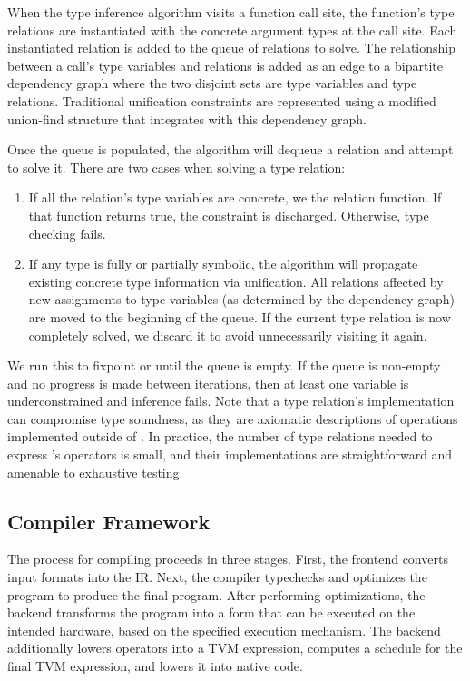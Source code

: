   When the type inference algorithm visits a function call site, the function's type relations are
    instantiated with the concrete argument types at the call site.
  Each instantiated relation is added to the queue of relations to solve.
  The relationship between a call's type variables and relations is added as an edge to
    a bipartite dependency graph where the two disjoint sets are type variables and type relations.
  Traditional unification constraints are represented using a modified union-find structure that
    integrates with this dependency graph.

  Once the queue is populated, the algorithm will dequeue a relation and attempt to solve it.
  There are two cases when solving a type relation:
  \begin{enumerate}
    \item If all the relation's type variables
    are concrete, we the relation function. If that function returns true, the
    constraint is discharged. Otherwise, type checking fails.
    \item If any type is fully or partially symbolic, the
      algorithm will propagate
      existing concrete type information via unification.
    All relations affected by new assignments to type
      variables (as determined by the dependency graph)
      are moved to the beginning of the queue.
    If the current type relation is now completely solved, we
    discard it to avoid unnecessarily visiting it again.
  \end{enumerate}

  We run this to fixpoint or until the queue is empty.
  If the queue is non-empty and no progress is made between iterations,
    then at least one variable is underconstrained and inference fails.
  Note that a type relation's implementation can
    compromise type soundness, as they are axiomatic descriptions
    of operations implemented outside of \relay.
  In practice, the number of type relations needed to express \relay's
    operators is small, and their implementations are straightforward
    and amenable to exhaustive testing.

  \subsection{Compiler Framework}

  The process for compiling \relay proceeds in three stages.
  First, the frontend converts input formats into the \relay IR.
  Next, the \relay compiler typechecks and optimizes the program
    to produce the final program.
  After performing optimizations,
    the \relay backend transforms
    the \relay program into a form that can be executed on
    the intended hardware, based on the specified execution mechanism.
  The backend additionally lowers \relay operators into a TVM expression,
    computes a schedule for the final TVM expression, and lowers it into
    native code.

